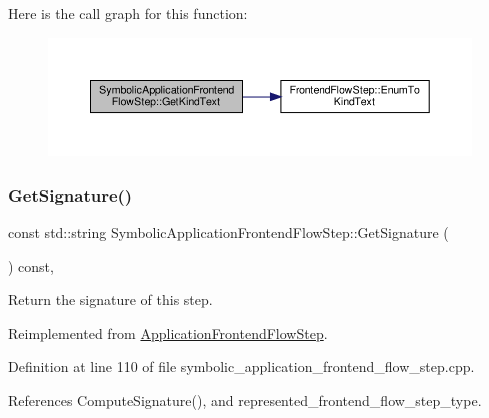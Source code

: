 Here is the call graph for this function\+:
\nopagebreak
\begin{figure}[H]
\begin{center}
\leavevmode
\includegraphics[width=350pt]{d5/dad/classSymbolicApplicationFrontendFlowStep_a3fdc0f543227c3393142eba328137704_cgraph}
\end{center}
\end{figure}
\mbox{\label{classSymbolicApplicationFrontendFlowStep_a556a719569a45bfc5f3554c1cc7558c3}} 
\subsubsection{\texorpdfstring{Get\+Signature()}{GetSignature()}}
{\footnotesize\ttfamily const std\+::string Symbolic\+Application\+Frontend\+Flow\+Step\+::\+Get\+Signature (\begin{DoxyParamCaption}{ }\end{DoxyParamCaption}) const\hspace{0.3cm}{\ttfamily [override]}, {\ttfamily [virtual]}}



Return the signature of this step. 



Reimplemented from \hyperlink{classApplicationFrontendFlowStep_a25500677dc27a20d35bdb4b45bfdba42}{Application\+Frontend\+Flow\+Step}.



Definition at line 110 of file symbolic\+\_\+application\+\_\+frontend\+\_\+flow\+\_\+step.\+cpp.



References Compute\+Signature(), and represented\+\_\+frontend\+\_\+flow\+\_\+step\+\_\+type.

